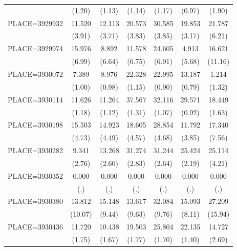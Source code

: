 {\begin{tabular}{l*{6}{c}}
                    &      (1.20)&      (1.13)&      (1.14)&      (1.17)&      (0.97)&      (1.90)\\
PLACE=3929932       &      11.520&      12.113&      20.573&      30.585&      19.853&      21.787\\
                    &      (3.91)&      (3.71)&      (3.83)&      (3.85)&      (3.17)&      (6.21)\\
PLACE=3929974       &      15.976&       8.892&      11.578&      24.605&       4.913&      16.621\\
                    &      (6.99)&      (6.64)&      (6.75)&      (6.91)&      (5.68)&     (11.16)\\
PLACE=3930072       &       7.389&       8.976&      22.328&      22.995&      13.187&       1.214\\
                    &      (1.00)&      (0.98)&      (1.15)&      (0.90)&      (0.79)&      (1.32)\\
PLACE=3930114       &      11.626&      11.264&      37.567&      32.116&      29.571&      18.449\\
                    &      (1.18)&      (1.12)&      (1.31)&      (1.07)&      (0.92)&      (1.63)\\
PLACE=3930198       &      15.503&      14.923&      18.605&      28.854&      11.792&      17.340\\
                    &      (4.73)&      (4.49)&      (4.57)&      (4.68)&      (3.85)&      (7.56)\\
PLACE=3930282       &       9.341&      13.268&      31.274&      31.244&      25.424&      25.114\\
                    &      (2.76)&      (2.60)&      (2.83)&      (2.64)&      (2.19)&      (4.21)\\
PLACE=3930352       &       0.000&       0.000&       0.000&       0.000&       0.000&       0.000\\
                    &         (.)&         (.)&         (.)&         (.)&         (.)&         (.)\\
PLACE=3930380       &      13.812&      15.148&      13.617&      32.084&      15.093&      27.209\\
                    &     (10.07)&      (9.44)&      (9.63)&      (9.76)&      (8.11)&     (15.94)\\
PLACE=3930436       &      11.720&      10.438&      19.503&      25.804&      22.135&      14.727\\
                    &      (1.75)&      (1.67)&      (1.77)&      (1.70)&      (1.40)&      (2.69)\\

\end{tabular}}

